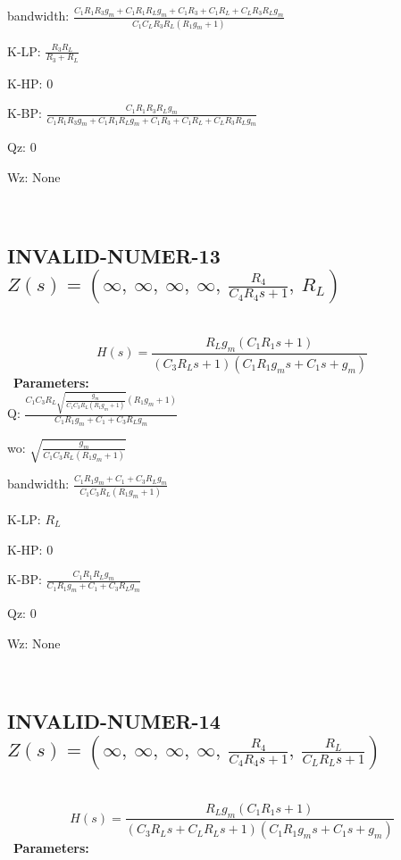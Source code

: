 \documentclass{article}
\begin{document}
bandwidth: $\frac{C_{1} R_{1} R_{3} g_{m} + C_{1} R_{1} R_{L} g_{m} + C_{1} R_{3} + C_{1} R_{L} + C_{L} R_{3} R_{L} g_{m}}{C_{1} C_{L} R_{3} R_{L} \left(R_{1} g_{m} + 1\right)}$\ 

K-LP: $\frac{R_{3} R_{L}}{R_{3} + R_{L}}$\ 

K-HP: $0$\ 

K-BP: $\frac{C_{1} R_{1} R_{3} R_{L} g_{m}}{C_{1} R_{1} R_{3} g_{m} + C_{1} R_{1} R_{L} g_{m} + C_{1} R_{3} + C_{1} R_{L} + C_{L} R_{3} R_{L} g_{m}}$\ 

Qz: $0$\ 

Wz: $\text{None}$\ 

\ 

\subsection{INVALID-NUMER-13 $Z(s) = \left( \infty, \  \infty, \  \infty, \  \infty, \  \frac{R_{4}}{C_{4} R_{4} s + 1}, \  R_{L}\right)$ } \ 
\textbf{\[H(s) = \frac{R_{L} g_{m} \left(C_{1} R_{1} s + 1\right)}{\left(C_{3} R_{L} s + 1\right) \left(C_{1} R_{1} g_{m} s + C_{1} s + g_{m}\right)}\] } \ 
\textbf{Parameters:}\\ 

Q: $\frac{C_{1} C_{3} R_{L} \sqrt{\frac{g_{m}}{C_{1} C_{3} R_{L} \left(R_{1} g_{m} + 1\right)}} \left(R_{1} g_{m} + 1\right)}{C_{1} R_{1} g_{m} + C_{1} + C_{3} R_{L} g_{m}}$\ 

wo: $\sqrt{\frac{g_{m}}{C_{1} C_{3} R_{L} \left(R_{1} g_{m} + 1\right)}}$\ 

bandwidth: $\frac{C_{1} R_{1} g_{m} + C_{1} + C_{3} R_{L} g_{m}}{C_{1} C_{3} R_{L} \left(R_{1} g_{m} + 1\right)}$\ 

K-LP: $R_{L}$\ 

K-HP: $0$\ 

K-BP: $\frac{C_{1} R_{1} R_{L} g_{m}}{C_{1} R_{1} g_{m} + C_{1} + C_{3} R_{L} g_{m}}$\ 

Qz: $0$\ 

Wz: $\text{None}$\ 

\ 

\subsection{INVALID-NUMER-14 $Z(s) = \left( \infty, \  \infty, \  \infty, \  \infty, \  \frac{R_{4}}{C_{4} R_{4} s + 1}, \  \frac{R_{L}}{C_{L} R_{L} s + 1}\right)$ } \ 
\textbf{\[H(s) = \frac{R_{L} g_{m} \left(C_{1} R_{1} s + 1\right)}{\left(C_{3} R_{L} s + C_{L} R_{L} s + 1\right) \left(C_{1} R_{1} g_{m} s + C_{1} s + g_{m}\right)}\] } \ 
\textbf{Parameters:}\\ 
\end{document}
